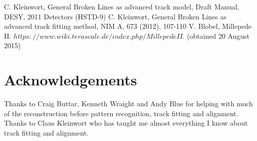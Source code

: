 \documentclass[a0,portrait]{a0poster}
\begin{document}
\begin{multicols}{2}
\begin{thebibliography}{9}
	  C. Kleinwort, General Broken Lines as advanced track model, Draft Manual, DESY, 2011
                        Detectors (HSTD-9)
	  C. Kleinwort, General Broken Lines as advanced track fitting method, NIM A, 673 (2012), 107-110
	 V. Blobel, Millepede II. $https://www.wiki.terascale.de/index.php/MillepedeII$. (obtained 20 August 2015)
\end{thebibliography}

\section*{Acknowledgements}
Thanks to Craig Buttar, Kenneth Wraight and Andy Blue for helping with much of the reconstruction before pattern recognition, track fitting and alignment. Thanks to Claus Kleinwort who has taught me almost everything I know about track fitting and alignment. 




\end{multicols}
\end{document}
